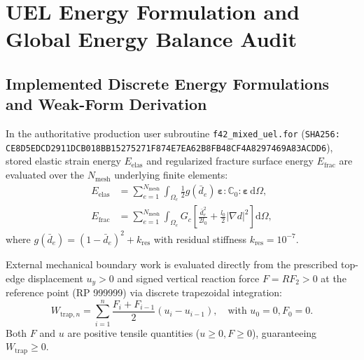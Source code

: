 \section{UEL Energy Formulation and Global Energy Balance Audit}
\label{sec:uel_energy_and_balance_audit}

\subsection{Implemented Discrete Energy Formulations and Weak-Form Derivation}
In the authoritative production user subroutine \nolinkurl{f42_mixed_uel.for} (\nolinkurl{SHA256: CE8D5EDCD2911DCB018BB15275271F874E7EA62B8FB48CF4A8297469A83ACDD6}), stored elastic strain energy $E_{\mathrm{elas}}$ and regularized fracture surface energy $E_{\mathrm{frac}}$ are evaluated over the $N_{\mathrm{mesh}}$ underlying finite elements:
\begin{align}
  E_{\mathrm{elas}} &= \sum_{e=1}^{N_{\mathrm{mesh}}} \int_{\Omega_e} \frac{1}{2} g(\bar{d}_e)\,\boldsymbol{\varepsilon} : \mathbb{C}_0 : \boldsymbol{\varepsilon} \,\mathrm{d}\Omega, \label{eq:elas_energy} \\
  E_{\mathrm{frac}} &= \sum_{e=1}^{N_{\mathrm{mesh}}} \int_{\Omega_e} G_c \left[ \frac{\bar{d}_e^2}{2 l_0} + \frac{l_0}{2} |\nabla d|^2 \right] \mathrm{d}\Omega, \label{eq:frac_energy}
\end{align}
where $g(\bar{d}_e) = (1-\bar{d}_e)^2 + k_{\mathrm{res}}$ with residual stiffness $k_{\mathrm{res}} = 10^{-7}$. 

External mechanical boundary work is evaluated directly from the prescribed top-edge displacement $u_y > 0$ and signed vertical reaction force $F = RF_2 > 0$ at the reference point (RP 999999) via discrete trapezoidal integration:
\begin{equation}
  W_{\mathrm{trap},n} = \sum_{i=1}^{n} \frac{F_i + F_{i-1}}{2}(u_i - u_{i-1}), \quad \text{with } u_0 = 0, F_0 = 0.
\end{equation}
Both $F$ and $u$ are positive tensile quantities ($u \ge 0, F \ge 0$), guaranteeing $W_{\mathrm{trap}} \ge 0$.

